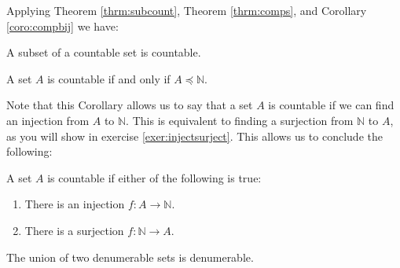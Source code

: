 Applying Theorem \ref{thrm:subcount}, Theorem \ref{thrm:comps}, and Corollary \ref{coro:compbij} we have:

\begin{coro}\label{coro:subdenum}
A subset of a countable set is countable.
\end{coro}

\begin{coro}
A set $A$ is countable if and only if $A\preceq\mathbb N$. 
\end{coro}

Note that this Corollary allows us to say that a set $A$ is countable if we can find an injection from $A$ to $\mathbb N$.  This is equivalent to finding a surjection from $\mathbb N$ to $A$, as you will show in exercise \ref{exer:injectsurject}. This allows us to conclude the following:

\begin{coro}\label{coro:countable}
A set $A$ is countable if either of the following is true:
\begin{enumerate}
\item There is an injection $f:A\to\mathbb N$.
\item There is a surjection $f:\mathbb N\to A$.
\end{enumerate}
\end{coro}

\begin{thrm}\label{thrm:uniondenum}
The union of two denumerable sets is denumerable.
\end{thrm}

